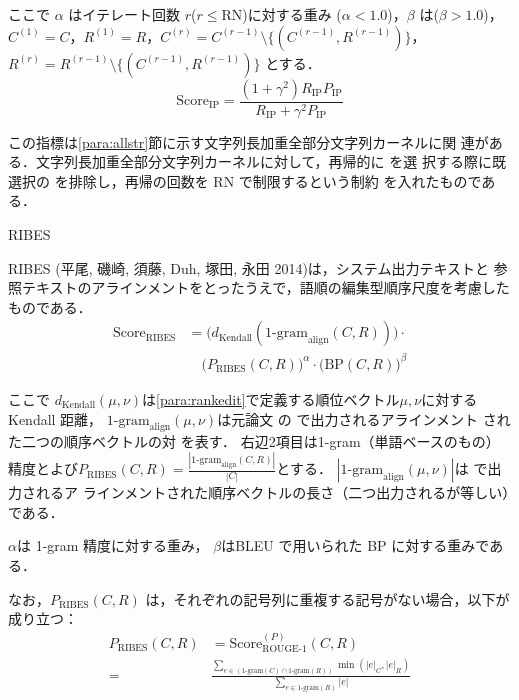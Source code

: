 \documentclass[japanese]{jnlp_1.4}
\renewcommand{\paragraph}{}
\newcommand{\modified}[1]{}
\begin{document}
ここで $\alpha$ はイテレート回数 $r$($r\leq \mbox{RN}$)に対する重み ($\alpha<1.0$)，$\beta$ は\modified{\modified{LCSubstr}長に対する重み}($\beta>1.0$)，$C^{(1)} = C$，$R^{(1)} = R$，$C^{(r)} = C^{(r-1)} \setminus \{\mbox{\modified{LCSubstr}}(C^{(r-1)} ,R^{(r-1)} )\}$，$R^{(r)} = R^{(r-1)} \setminus \{\mbox{\modified{LCSubstr}}(C^{(r-1)} ,R^{(r-1)} )\}$
\pagebreak
とする．
\[
 \mbox{Score}_{\mbox{IP}} = \frac{(1+\gamma^{2})R_{\mbox{IP}}P_{\mbox{IP}}}{R_{\mbox{IP}}+\gamma^{2}P_{\mbox{IP}}}
\]

この指標は\ref{para:allstr}節に示す文字列長加重全部分文字列カーネルに関
連がある．文字列長加重全部分文字列カーネルに対して，再帰的に \modified{LCSubstr} を選
択する際に既選択の \modified{LCSubstr} を排除し，再帰の回数を RN で制限するという制約
を入れたものである．


\paragraph{RIBES}
\label{para:RIBES}

    RIBES (平尾, 磯崎, 須藤, Duh, 塚田, 永田 2014)は，\nocite{hirao-2014-JNLP-journal}システム出力テキストと
参照テキストのアラインメントをとったうえで，語順の編集型順序尺度を考慮したものである．
\[
\begin{split}
 \mbox{Score}_{\mbox{RIBES}}
 & = \Biggl( d_{\mbox{Kendall}}(\mbox{1-gram}_{\mbox{align}}(C,R)) \Biggr) \cdot \\
 & \quad \Biggl( P_{\mbox{RIBES}}(C,R)  \Biggr)^{\alpha} \cdot
  \Biggl( \mbox{BP}(C,R)  \Biggr)^{\beta}
\end{split} 
\]

ここで $d_{\mbox{Kendall}}(\mu,\nu)$は\ref{para:rankedit}\modified{節}で定義する順位ベクトル$\mu,\nu$に対する Kendall 距離，
$\mbox{1-gram}_{\mbox{align}}(\mu,\nu)$は元論文
\cite{hirao-2014-JNLP-journal}の \modified{{\tt worder}} で出力されるアラインメント
された二つの順序ベクトルの対
を表す．
右辺2項目は1-gram（単語ベースのもの）精度とよび$P_{\mbox{RIBES}}(C,R) = \frac{|\mbox{1-gram}_{\mbox{align}}(C,R)|}{|C|}$とする．
$|\mbox{1-gram}_{\mbox{align}}(\mu,\nu)|$は \modified{{\tt worder}} で出力されるア
ラインメントされた順序ベクトルの長さ（二つ出力されるが等しい）である．

$\alpha$は 1-gram 精度に対する重み，
$\beta$はBLEU で用いられた BP に対する重みである．

なお，$P_{\mbox{RIBES}}(C,R)$ は，それぞれの記号列に重複する記号がない場合，以下が成り立つ：
\begin{align*}
 P_{\mbox{RIBES}}(C,R) &= \mbox{Score}^{(P)}_{\mbox{ROUGE-1}}(C,R)  \\[1ex]
     = & \frac{\displaystyle \sum_{e\in(\mbox{1-gram}(C) \cap \mbox{1-gram}(R))} \min(|e|_{C},|e|_{R})}{\displaystyle \sum_{e\in\mbox{1-gram}(R)} |e|}
\end{align*}
\end{document}
